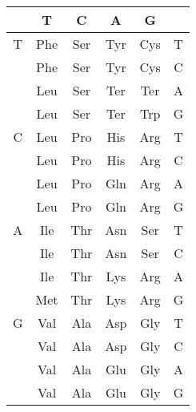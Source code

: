 \begin{tabular}{c|cccc|c}
 & T & C & A & G\\\hline
T & Phe & Ser & Tyr & Cys & T\\
 & Phe & Ser & Tyr & Cys & C\\
 & Leu & Ser & Ter & Ter & A\\
 & Leu & Ser & Ter & Trp & G\\
C & Leu & Pro & His & Arg & T\\
 & Leu & Pro & His & Arg & C\\
 & Leu & Pro & Gln & Arg & A\\
 & Leu & Pro & Gln & Arg & G\\
A & Ile & Thr & Asn & Ser & T\\
 & Ile & Thr & Asn & Ser & C\\
 & Ile & Thr & Lys & Arg & A\\
 & Met & Thr & Lys & Arg & G\\
G & Val & Ala & Asp & Gly & T\\
 & Val & Ala & Asp & Gly & C\\
 & Val & Ala & Glu & Gly & A\\
 & Val & Ala & Glu & Gly & G\\
\end{tabular}
